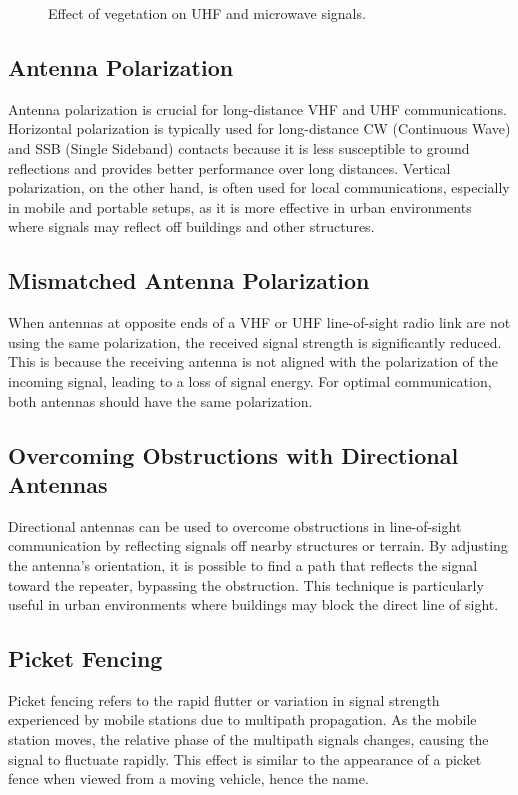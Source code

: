 \begin{figure}[h!]
    \centering
    \caption{Effect of vegetation on UHF and microwave signals.}
    \label{fig:vegetation_absorption}
\end{figure}

\subsection*{Antenna Polarization}
Antenna polarization is crucial for long-distance VHF and UHF communications. Horizontal polarization is typically used for long-distance CW (Continuous Wave) and SSB (Single Sideband) contacts because it is less susceptible to ground reflections and provides better performance over long distances. Vertical polarization, on the other hand, is often used for local communications, especially in mobile and portable setups, as it is more effective in urban environments where signals may reflect off buildings and other structures.

\subsection*{Mismatched Antenna Polarization}
When antennas at opposite ends of a VHF or UHF line-of-sight radio link are not using the same polarization, the received signal strength is significantly reduced. This is because the receiving antenna is not aligned with the polarization of the incoming signal, leading to a loss of signal energy. For optimal communication, both antennas should have the same polarization.

\subsection*{Overcoming Obstructions with Directional Antennas}
Directional antennas can be used to overcome obstructions in line-of-sight communication by reflecting signals off nearby structures or terrain. By adjusting the antenna's orientation, it is possible to find a path that reflects the signal toward the repeater, bypassing the obstruction. This technique is particularly useful in urban environments where buildings may block the direct line of sight.

\subsection*{Picket Fencing}
Picket fencing refers to the rapid flutter or variation in signal strength experienced by mobile stations due to multipath propagation. As the mobile station moves, the relative phase of the multipath signals changes, causing the signal to fluctuate rapidly. This effect is similar to the appearance of a picket fence when viewed from a moving vehicle, hence the name.

